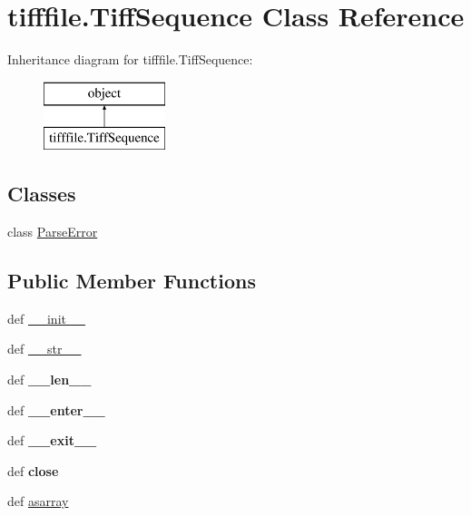 \hypertarget{classtifffile_1_1TiffSequence}{\section{tifffile.\-Tiff\-Sequence Class Reference}
\label{classtifffile_1_1TiffSequence}
}
Inheritance diagram for tifffile.\-Tiff\-Sequence\-:\begin{figure}[H]
\begin{center}
\leavevmode
\includegraphics[height=2.000000cm]{classtifffile_1_1TiffSequence}
\end{center}
\end{figure}
\subsection*{Classes}
\begin{DoxyCompactItemize}
\item 
class \hyperlink{classtifffile_1_1TiffSequence_1_1ParseError}{Parse\-Error}
\end{DoxyCompactItemize}
\subsection*{Public Member Functions}
\begin{DoxyCompactItemize}
\item 
def \hyperlink{classtifffile_1_1TiffSequence_ad2a937998bb0fbb469fd45af3c5b9ee4}{\-\_\-\-\_\-init\-\_\-\-\_\-}
\item 
def \hyperlink{classtifffile_1_1TiffSequence_ab271e42b6b0a2d34069c16813b3c6396}{\-\_\-\-\_\-str\-\_\-\-\_\-}
\item 
\hypertarget{classtifffile_1_1TiffSequence_a1e84248e6ff24c50927c27ea3387ae20}{def {\bfseries \-\_\-\-\_\-len\-\_\-\-\_\-}}\label{classtifffile_1_1TiffSequence_a1e84248e6ff24c50927c27ea3387ae20}

\item 
\hypertarget{classtifffile_1_1TiffSequence_a22f8614649ba8ee39f28db15de453406}{def {\bfseries \-\_\-\-\_\-enter\-\_\-\-\_\-}}\label{classtifffile_1_1TiffSequence_a22f8614649ba8ee39f28db15de453406}

\item 
\hypertarget{classtifffile_1_1TiffSequence_a5af53397d4d20dc45a6afeafb7798103}{def {\bfseries \-\_\-\-\_\-exit\-\_\-\-\_\-}}\label{classtifffile_1_1TiffSequence_a5af53397d4d20dc45a6afeafb7798103}

\item 
\hypertarget{classtifffile_1_1TiffSequence_a66ea3eced1f21205b7fbc4632b7cf41a}{def {\bfseries close}}\label{classtifffile_1_1TiffSequence_a66ea3eced1f21205b7fbc4632b7cf41a}

\item 
def \hyperlink{classtifffile_1_1TiffSequence_a881cfef0cf4ae0deb1a3fd40b57ff38a}{asarray}
\end{DoxyCompactItemize}
